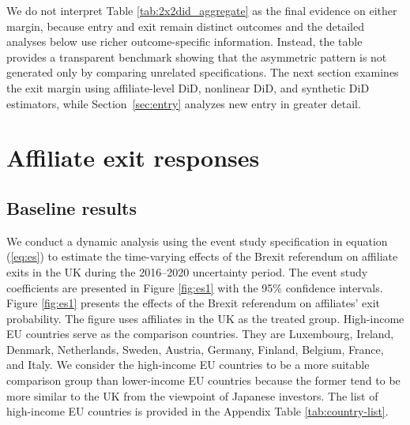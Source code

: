 \documentclass[preprint,11pt,authoryear]{elsarticle}
\begin{document}
We do not interpret Table \ref{tab:2x2did_aggregate} as the final evidence on either margin, because entry and exit remain distinct outcomes and the detailed analyses below use richer outcome-specific information. Instead, the table provides a transparent benchmark showing that the asymmetric pattern is not generated only by comparing unrelated specifications. The next section examines the exit margin using affiliate-level DiD, nonlinear DiD, and synthetic DiD estimators, while Section~\ref{sec:entry} analyzes new entry in greater detail.


{\renewcommand\normalsize{\scriptsize}%
\normalsize 

}

\section{Affiliate exit responses \label{sec:results}}
\subsection{Baseline results}\label{sec:twfe}

We conduct a dynamic analysis using the event study specification in equation (\ref{eq:es}) to estimate the time-varying effects of the Brexit referendum on affiliate exits in the UK during the 2016--2020 uncertainty period. 
The event study coefficients are presented in Figure \ref{fig:es1} with the 95\% confidence intervals.
Figure \ref{fig:es1} presents the effects of the Brexit referendum on affiliates' exit probability.
The figure uses affiliates in the UK as the treated group.
High-income EU countries serve as the comparison countries. They are Luxembourg, Ireland, Denmark, Netherlands, Sweden, Austria, Germany, Finland, Belgium, France, and Italy.
We consider the high-income EU countries to be a more suitable comparison group than lower-income EU countries because the former tend to be more similar to the UK from the viewpoint of Japanese investors. The list of high-income EU countries is provided in the Appendix Table \ref{tab:country-list}.
\end{document}
